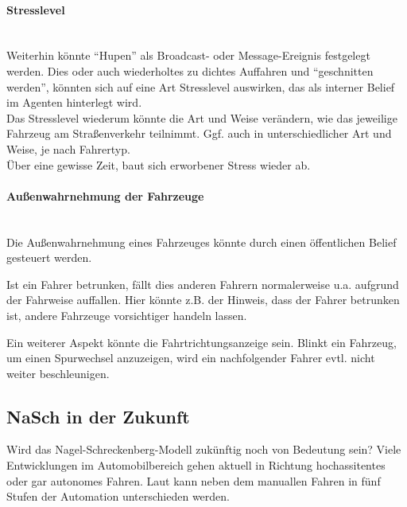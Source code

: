 \paragraph*{Stresslevel}
\hfill \\
Weiterhin könnte \enquote{Hupen} als Broadcast- oder Message-Ereignis festgelegt werden.
Dies oder auch wiederholtes zu dichtes Auffahren und \enquote{geschnitten werden}, könnten sich auf eine Art Stresslevel auswirken, das als interner Belief im Agenten hinterlegt wird.
\\
Das Stresslevel wiederum könnte die Art und Weise verändern, wie das jeweilige Fahrzeug am Straßenverkehr teilnimmt. 
Ggf. auch in unterschiedlicher Art und Weise, je nach Fahrertyp.
\\
Über eine gewisse Zeit, baut sich erworbener Stress wieder ab.

\paragraph*{Außenwahrnehmung der Fahrzeuge}
\hfill \\
Die Außenwahrnehmung eines Fahrzeuges könnte durch einen öffentlichen Belief gesteuert werden. 

Ist ein Fahrer betrunken, fällt dies anderen Fahrern normalerweise u.a. aufgrund der Fahrweise auffallen.
Hier könnte z.B. der Hinweis, dass der Fahrer betrunken ist, andere Fahrzeuge vorsichtiger handeln lassen.

Ein weiterer Aspekt könnte die Fahrtrichtungsanzeige sein.
Blinkt ein Fahrzeug, um einen Spurwechsel anzuzeigen, wird ein nachfolgender Fahrer evtl. nicht weiter beschleunigen. 




\subsection{NaSch in der Zukunft}
Wird das Nagel-Schreckenberg-Modell zukünftig noch von Bedeutung sein? 
Viele Entwicklungen im Automobilbereich gehen aktuell in Richtung hochassitentes oder gar autonomes Fahren.
Laut \cite{automation-level} kann neben dem manuallen Fahren in fünf Stufen der Automation unterschieden werden.

